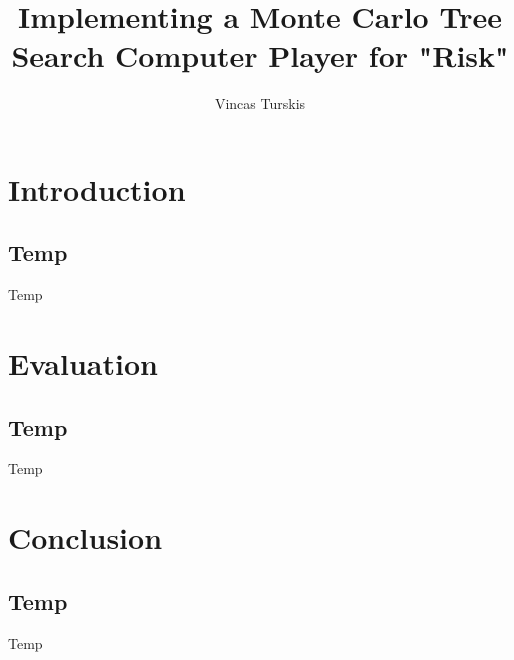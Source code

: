 \documentclass[11pt,a4paper]{report}
\author{Vincas Turskis}
\title{Implementing a Monte Carlo Tree Search Computer Player for "Risk"}
\begin{document}
\maketitle
\tableofcontents
\chapter{Introduction}
\section{Temp}
Temp







\chapter{Evaluation}
\section{Temp}
Temp

\chapter{Conclusion}
\section{Temp}
Temp

\printbibliography
\end{document}
